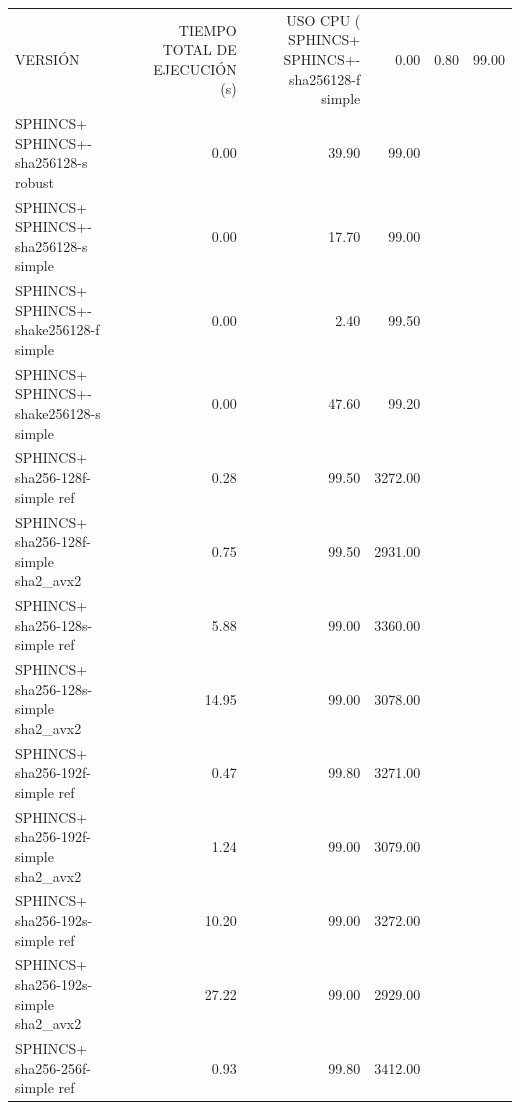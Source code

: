 \begin{tabular}{lrrr}
\toprule
                                 VERSIÓN &  TIEMPO TOTAL DE EJECUCIÓN (s) &  USO CPU (%
\midrule
    SPHINCS+ SPHINCS+-sha256128-f simple &                           0.00 &         0.80 &                              99.00 \\
    SPHINCS+ SPHINCS+-sha256128-s robust &                           0.00 &        39.90 &                              99.00 \\
    SPHINCS+ SPHINCS+-sha256128-s simple &                           0.00 &        17.70 &                              99.00 \\
  SPHINCS+ SPHINCS+-shake256128-f simple &                           0.00 &         2.40 &                              99.50 \\
  SPHINCS+ SPHINCS+-shake256128-s simple &                           0.00 &        47.60 &                              99.20 \\
         SPHINCS+ sha256-128f-simple ref &                           0.28 &        99.50 &                            3272.00 \\
   SPHINCS+ sha256-128f-simple sha2_avx2 &                           0.75 &        99.50 &                            2931.00 \\
         SPHINCS+ sha256-128s-simple ref &                           5.88 &        99.00 &                            3360.00 \\
   SPHINCS+ sha256-128s-simple sha2_avx2 &                          14.95 &        99.00 &                            3078.00 \\
         SPHINCS+ sha256-192f-simple ref &                           0.47 &        99.80 &                            3271.00 \\
   SPHINCS+ sha256-192f-simple sha2_avx2 &                           1.24 &        99.00 &                            3079.00 \\
         SPHINCS+ sha256-192s-simple ref &                          10.20 &        99.00 &                            3272.00 \\
   SPHINCS+ sha256-192s-simple sha2_avx2 &                          27.22 &        99.00 &                            2929.00 \\
         SPHINCS+ sha256-256f-simple ref &                           0.93 &        99.80 &                            3412.00 \\

\end{tabular}
